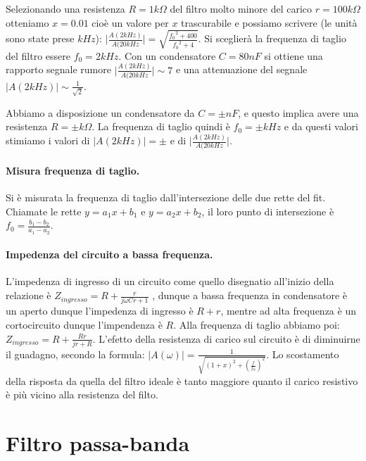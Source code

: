 \documentclass[10pt,a4paper]{article}
\begin{document}
Selezionando una resistenza $R = 1 k\Omega$ del filtro molto minore del carico $r = 100 k\Omega$ otteniamo $x = 0.01$ cioè un valore per $x$ trascurabile e possiamo scrivere (le unità sono state prese $kHz$): 
$\vert \frac{A(2 kHz)}{A(20 kHz} \vert = \sqrt{\frac{{f_0}^2  + 400}{{f_0}^2 + 4}}$. Si sceglierà la frequenza di taglio del filtro essere $f_0 = 2kHz$. Con un condensatore $C = 80 nF$ si ottiene una rapporto segnale rumore $\vert \frac{A(2 kHz)}{A(20 kHz} \vert \sim 7$ e una attenuazione del segnale $\vert A(2 kHz) \vert \sim \frac{1}{\sqrt{2}}$.

Abbiamo a disposizione un condensatore da $C = \pm nF$, e questo implica avere una resistenza $R = \pm k\Omega$.
La frequenza di taglio quindi è $f_0 = \pm kHz$ e da questi valori stimiamo i valori di $\vert A(2 kHz) \vert = \pm $ e di $\vert \frac{A(2 kHz)}{A(20 kHz} \vert$.

\paragraph{Misura frequenza di taglio.}

Si è misurata la frequenza di taglio dall'intersezione delle due rette del fit. Chiamate le rette $y = a_1 x+b_1$ e $y = a_2 x+b_2$, il loro punto di intersezione è $f_0 = \frac{b_1 - b_2}{a_1 - a_2}$. 

\paragraph{Impedenza del circuito a bassa frequenza.}
L'impedenza di ingresso di un circuito come quello disegnatio all'inizio della relazione è $Z_{ingresso} = R+\frac{r}{j \omega C r+1}$ , dunque a bassa frequenza in condensatore è un aperto dunque l'impedenza di ingresso è $R+r$, mentre ad alta frequenza è un cortocircuito dunque l'impendenza è $R$. Alla frequenza di taglio abbiamo poi: $Z_{ingresso} = R + \frac{Rr}{jr+R}$. L'efetto della resistenza di carico sul circuito è di diminuirne il guadagno, secondo la formula: $\vert A(\omega) \vert = \frac{1}{\sqrt{(1+x)^2+(\frac{f}{f_{0}})^2}} $.
Lo scostamento della risposta da quella del filtro ideale è tanto maggiore quanto il carico resistivo è più vicino alla resistenza del filto.

\section{Filtro passa-banda}
\end{document}
